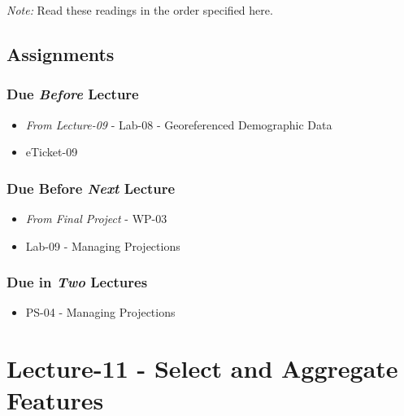 \documentclass[]{book}
\providecommand{\tightlist}{%
  \setlength{\itemsep}{0pt}\setlength{\parskip}{0pt}}
\begin{document}
\emph{Note:} Read these readings in the order specified here.

\hypertarget{assignments-11}{%
\subsection*{Assignments}\label{assignments-11}}

\hypertarget{due-before-lecture-9}{%
\subsubsection*{\texorpdfstring{Due \emph{Before} Lecture}{Due Before Lecture}}\label{due-before-lecture-9}}

\begin{itemize}
\tightlist
\item
  \emph{From Lecture-09} - Lab-08 - Georeferenced Demographic Data
\item
  eTicket-09
\end{itemize}

\hypertarget{due-before-next-lecture-8}{%
\subsubsection*{\texorpdfstring{Due Before \emph{Next} Lecture}{Due Before Next Lecture}}\label{due-before-next-lecture-8}}

\begin{itemize}
\tightlist
\item
  \emph{From Final Project} - WP-03
\item
  Lab-09 - Managing Projections
\end{itemize}

\hypertarget{due-in-two-lectures-4}{%
\subsubsection*{\texorpdfstring{Due in \emph{Two} Lectures}{Due in Two Lectures}}\label{due-in-two-lectures-4}}

\begin{itemize}
\tightlist
\item
  PS-04 - Managing Projections
\end{itemize}

\hypertarget{lecture-11---select-and-aggregate-features}{%
\section*{Lecture-11 - Select and Aggregate Features}\label{lecture-11---select-and-aggregate-features}}
\end{document}
